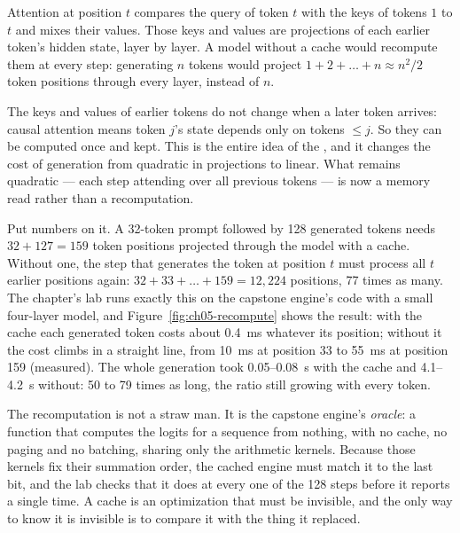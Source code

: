 Attention at position $t$ compares the query of token $t$ with the keys of
tokens $1$ to $t$ and mixes their values. Those keys and values are
projections of each earlier token's hidden state, layer by layer. A model
without a cache would recompute them at every step: generating $n$ tokens
would project $1+2+\dots+n \approx n^{2}/2$ token positions through every
layer, instead of $n$.

The keys and values of earlier tokens do not change when a later token
arrives: causal attention means token $j$'s state depends only on tokens
$\le j$. So they can be computed once and kept. This is the entire idea of
the , and it changes the cost of generation from quadratic in
projections to linear. What remains quadratic --- each step attending over all
previous tokens --- is now a memory read rather than a recomputation.

Put numbers on it. A 32-token prompt followed by 128 generated tokens needs
$32 + 127 = 159$ token positions projected through the model with a cache. Without
one, the step that generates the token at position $t$ must process all $t$
earlier positions again: $32 + 33 + \dots + 159 = 12{,}224$ positions, 77 times
as many. The chapter's lab runs exactly this on the capstone engine's code with
a small four-layer model, and Figure~\ref{fig:ch05-recompute} shows the result:
with the cache each generated token costs about 0.4~ms whatever its position;
without it the cost climbs in a straight line, from 10~ms at position 33 to 55~ms
at position 159 (measured). The whole generation took 0.05--0.08~s with the
cache and 4.1--4.2~s without: 50 to 79 times as long, the ratio still growing
with every token.


The recomputation is not a straw man. It is the capstone engine's
\emph{oracle}: a function that computes the logits for a sequence from nothing,
with no cache, no paging and no batching, sharing only the arithmetic kernels.
Because those kernels fix their summation order, the cached engine must match
it to the last bit, and the lab checks that it does at every one of the 128
steps before it reports a single time. A cache is an optimization that must be
invisible, and the only way to know it is invisible is to compare it with the
thing it replaced.

